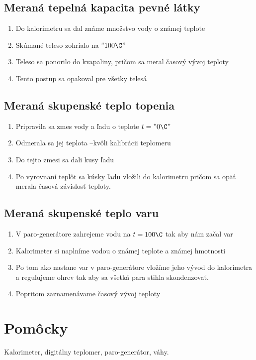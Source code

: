 \documentclass[a4paper,10pt]{article}
\begin{document}
\subsection{Meraná tepelná kapacita pevné látky}
\begin{enumerate}
\item Do kalorimetru sa dal známe množstvo vody o známej teplote
\item Skúmané teleso zohrialo na $"100 \C"$
\item Teleso sa ponorilo do kvapaliny, pričom sa meral časový vývoj teploty
\item Tento postup sa opakoval pre všetky telesá
\end{enumerate}
\subsection{Meraná skupenské teplo topenia}
\begin{enumerate}
\item Pripravila sa zmes vody a ľadu o teplote $t="0 \C"$
\item Odmerala sa jej teplota --kvôli kalibrácii teplomeru
\item Do tejto zmesi sa dali kusy ľadu
\item Po vyrovnaní teplôt sa kúsky ľadu vložili do kalorimetru pričom sa opäť merala časová závislosť teploty.
\end{enumerate}

\subsection{Meraná skupenské teplo varu}
\begin{enumerate}
\item V paro-generátore zahrejeme vodu na $t=100\C$ tak aby nám začal var
\item Kalorimeter si naplníme vodou o známej teplote a známej hmotnosti
\item Po tom ako nastane var v paro-generátore vložíme jeho vývod do kalorimetra a regulujeme ohrev tak aby sa všetká para stihla skondenzovať.
\item Popritom zaznamenávame časový vývoj teploty 
\end{enumerate}

\section{Pomôcky}
Kalorimeter, digitálny teplomer, paro-generátor, váhy.
\end{document}
